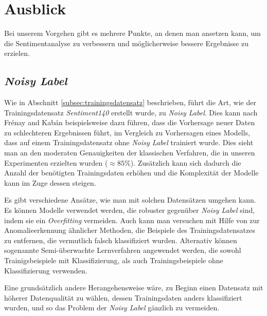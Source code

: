 \section{Ausblick}


Bei unserem Vorgehen gibt es mehrere Punkte, an denen man ansetzen kann, um die Sentimentanalyse zu verbessern und möglicherweise bessere Ergebnisse zu erzielen.

\subsection{\textit{Noisy Label}}
Wie in Abschnitt \ref{subsec:trainingsdatensatz} beschrieben, führt die Art, wie der Trainingsdatensatz \textit{Sentiment140} erstellt wurde, zu \textit{Noisy Label}. Dies kann nach Fr{\'e}nay and Kab{\'a}n \cite{NoisyLabel2014} beispielsweise dazu führen, dass die Vorhersage neuer Daten zu schlechteren Ergebnissen führt, im Vergleich zu Vorhersagen eines Modells, dass auf einem Trainingsdatensatz ohne \textit{Noisy Label} trainiert wurde. Dies sieht man an den moderaten Genauigkeiten der klassischen Verfahren, die in unseren Experimenten erzielten wurden ($\approx{85} \%$). Zusätzlich kann sich dadurch die Anzahl der benötigten Trainingsdaten erhöhen und die Komplexität der Modelle kann im Zuge dessen steigen.

Es gibt verschiedene Ansätze, wie man mit solchen Datensätzen umgehen kann. Es können Modelle verwendet werden, die robuster gegenüber \textit{Noisy Label} sind, indem sie ein \textit{Overfitting} vermeiden. Auch kann man versuchen mit Hilfe von zur Anomalieerkennung ähnlicher Methoden, die Beispiele des Trainingsdatensatzes zu entfernen, die vermutlich falsch klassifiziert wurden. Alternativ können sogenannte Semi-überwachte Lernverfahren angewendet werden, die sowohl Trainigsbeispiele mit Klassifizierung, als auch Trainingsbeispiele ohne Klassifizierung verwenden.

Eine grundsätzlich andere Herangehensweise wäre, zu Beginn einen Datensatz mit höherer Datenqualität zu wählen, dessen Trainingsdaten anders klassifiziert wurden, und so das Problem der \textit{Noisy Label} gänzlich zu vermeiden.



